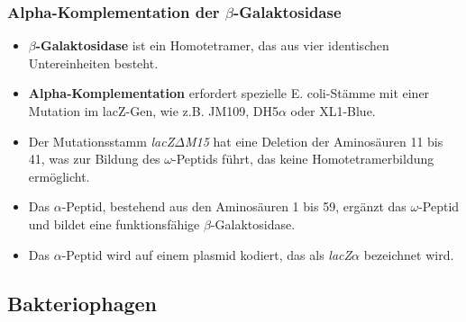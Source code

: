 \subsubsection{Alpha-Komplementation der $\beta$-Galaktosidase}
\begin{itemize}
    \item \textbf{$\beta$-Galaktosidase} ist ein Homotetramer, das aus vier identischen Untereinheiten besteht. 
    \item \textbf{Alpha-Komplementation} erfordert spezielle E. coli-Stämme mit einer Mutation im lacZ-Gen, wie z.B. JM109, DH5$\alpha$ oder XL1-Blue.  
    \item Der Mutationsstamm \textit{lacZ$\Delta$M15} hat eine Deletion der Aminosäuren 11 bis 41, was zur Bildung des \textit{$\omega$}-Peptids führt, das keine Homotetramerbildung ermöglicht.
    \item Das \textit{$\alpha$}-Peptid, bestehend aus den Aminosäuren 1 bis 59, ergänzt das \textit{$\omega$}-Peptid und bildet eine funktionsfähige $\beta$-Galaktosidase.
    \item Das \textit{$\alpha$}-Peptid wird auf einem \gls{plasmid} kodiert, das als \textit{lacZ$\alpha$} bezeichnet wird.
\end{itemize}


\subsection{Bakteriophagen}
